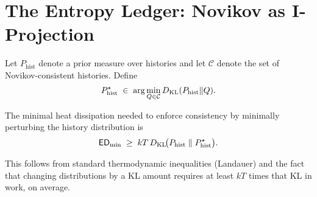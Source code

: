 
\section{The Entropy Ledger: Novikov as I-Projection}
Let $P_{\text{hist}}$ denote a prior measure over histories and let $\mathcal{C}$ denote the set of Novikov-consistent histories. Define
\[
P_{\text{hist}}^\star \;\in\; \arg\min_{Q\in\mathcal{C}} D_{\mathrm{KL}}(P_{\text{hist}}\Vert Q).
\]
\begin{theorem}
The minimal heat dissipation needed to enforce consistency by minimally perturbing the history distribution is
\[
\mathsf{ED}_{\min} \;\ge\; kT\,D_{\mathrm{KL}}\!\big(P_{\text{hist}}\;\Vert\;P_{\text{hist}}^\star\big).
\]
\end{theorem}
This follows from standard thermodynamic inequalities (Landauer) and the fact that changing distributions by a KL amount requires at least $kT$ times that KL in work, on average.
